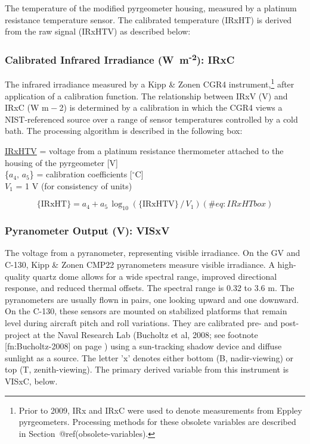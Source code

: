 \documentclass[
  english,
]{book}
\begin{document}
The temperature of the modified pyrgeometer housing, measured by a
platinum resistance temperature sensor. The calibrated temperature
(IRxHT) is derived from the raw signal (IRxHTV) as described below:

\hypertarget{irxc}{%
\subsubsection*{\texorpdfstring{Calibrated Infrared Irradiance
(W~m\textsuperscript{-2}):
IRxC}{Calibrated Infrared Irradiance (W~m-2): IRxC}}\label{irxc}}

The infrared irradiance measured by a Kipp \& Zonen CGR4
instrument,\footnote{Prior to 2009, IRx and IRxC were used to denote
  measurements from Eppley pyrgeometers. Processing methods for these
  obsolete variables are described in Section~@ref(obsolete-variables).}
after application of a calibration function. The relationship between
IRxV (V) and IRxC (W m{ − 2}) is determined by a calibration in which
the CGR4 views a NIST-referenced source over a range of sensor
temperatures controlled by a cold bath. The processing algorithm is
described in the following box:

\protect\hyperlink{irxht}{IRxHTV} = voltage from a platinum resistance
thermometer attached to the housing of the pyrgeometer {[}V{]}\\
\{\(a_4,\,a_5\)\} = calibration coefficients {[}\(^\circ\)C{]}\\
\(V_1\) = 1 V (for consistency of units)

\begin{equation}
\mathrm{\{IRxHT\}} = a_4 + a_5\,\log_{10}(\mathrm{\{IRxHTV\}}\,/\,V_1)
(\#eq:IRxHTbox)
\end{equation}

\hypertarget{visxv}{%
\subsubsection*{Pyranometer Output (V): VISxV}\label{visxv}}

The voltage from a pyranometer, representing visible irradiance. On the
GV and C-130, Kipp \& Zonen CMP22 pyranometers measure visible
irradiance. A high-quality quartz dome allows for a wide spectral range,
improved directional response, and reduced thermal offsets. The spectral
range is 0.32 to 3.6 m. The pyranometers are usually flown in pairs, one
looking upward and one downward. On the C-130, these sensors are mounted
on stabilized platforms that remain level during aircraft pitch and roll
variations. They are calibrated pre- and post-project at the Naval
Research Lab (Bucholtz et al, 2008; see footnote {[}fn:Bucholtz-2008{]}
on page ) using a sun-tracking shadow device and diffuse sunlight as a
source. The letter 'x' denotes either bottom (B, nadir-viewing) or top
(T, zenith-viewing). The primary derived variable from this instrument
is VISxC, below.
\end{document}
